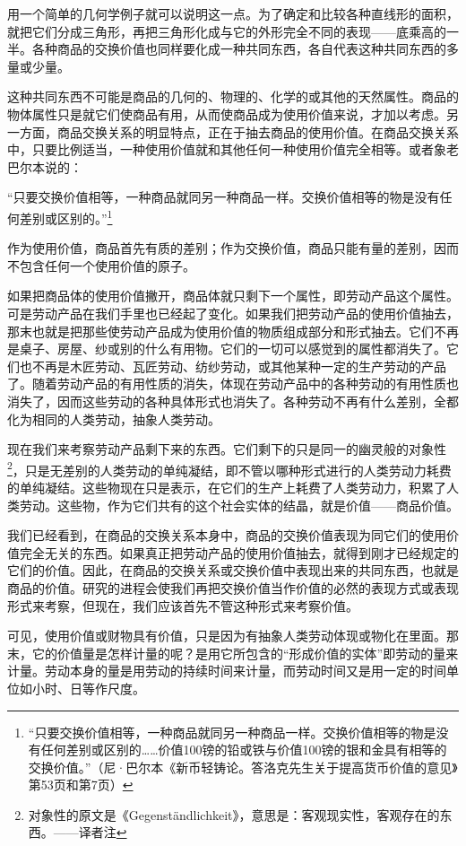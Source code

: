 \documentclass{ctexbook}
\begin{document}
    用一个简单的几何学例子就可以说明这一点。为了确定和比较各种直线形的面积，就把它们分成三角形，再把三角形化成与它的外形完全不同的表现——底乘高的一半。各种商品的交换价值也同样要化成一种共同东西，各自代表这种共同东西的多量或少量。

    这种共同东西不可能是商品的几何的、物理的、化学的或其他的天然属性。商品的物体属性只是就它们使商品有用，从而使商品成为使用价值来说，才加以考虑。另一方面，商品交换关系的明显特点，正在于抽去商品的使用价值。在商品交换关系中，只要比例适当，一种使用价值就和其他任何一种使用价值完全相等。或者象老巴尔本说的：

    “只要交换价值相等，一种商品就同另一种商品一样。交换价值相等的物是没有任何差别或区别的。”\footnote{“只要交换价值相等，一种商品就同另一种商品一样。交换价值相等的物是没有任何差别或区别的……价值100镑的铅或铁与价值100镑的银和金具有相等的交换价值。”（尼·巴尔本《新币轻铸论。答洛克先生关于提高货币价值的意见》第53页和第7页）}

    作为使用价值，商品首先有质的差别；作为交换价值，商品只能有量的差别，因而不包含任何一个使用价值的原子。

    如果把商品体的使用价值撇开，商品体就只剩下一个属性，即劳动产品这个属性。可是劳动产品在我们手里也已经起了变化。如果我们把劳动产品的使用价值抽去，那末也就是把那些使劳动产品成为使用价值的物质组成部分和形式抽去。它们不再是桌子、房屋、纱或别的什么有用物。它们的一切可以感觉到的属性都消失了。它们也不再是木匠劳动、瓦匠劳动、纺纱劳动，或其他某种一定的生产劳动的产品了。随着劳动产品的有用性质的消失，体现在劳动产品中的各种劳动的有用性质也消失了，因而这些劳动的各种具体形式也消失了。各种劳动不再有什么差别，全都化为相同的人类劳动，抽象人类劳动。

    现在我们来考察劳动产品剩下来的东西。它们剩下的只是同一的幽灵般的对象性\footnote{对象性的原文是《Gegenständlichkeit》，意思是：客观现实性，客观存在的东西。——译者注}，只是无差别的人类劳动的单纯凝结，即不管以哪种形式进行的人类劳动力耗费的单纯凝结。这些物现在只是表示，在它们的生产上耗费了人类劳动力，积累了人类劳动。这些物，作为它们共有的这个社会实体的结晶，就是价值——商品价值。

    我们已经看到，在商品的交换关系本身中，商品的交换价值表现为同它们的使用价值完全无关的东西。如果真正把劳动产品的使用价值抽去，就得到刚才已经规定的它们的价值。因此，在商品的交换关系或交换价值中表现出来的共同东西，也就是商品的价值。研究的进程会使我们再把交换价值当作价值的必然的表现方式或表现形式来考察，但现在，我们应该首先不管这种形式来考察价值。

    可见，使用价值或财物具有价值，只是因为有抽象人类劳动体现或物化在里面。那末，它的价值量是怎样计量的呢？是用它所包含的“形成价值的实体”即劳动的量来计量。劳动本身的量是用劳动的持续时间来计量，而劳动时间又是用一定的时间单位如小时、日等作尺度。
\end{document}
